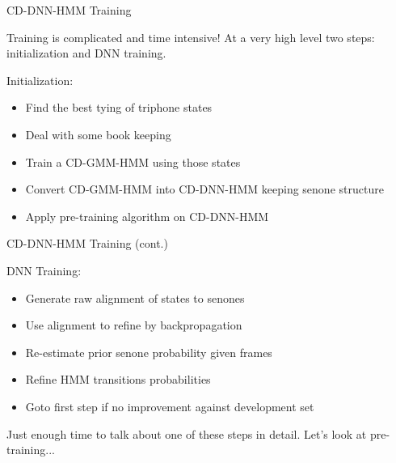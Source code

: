 \documentclass[notes]{beamer}
\begin{document}
\begin{frame}{CD-DNN-HMM Training}
	\begin{center}
		Training is complicated and time intensive! At a very high level two steps: initialization and DNN training.
	\end{center}
	
	\vfill
	
	Initialization:
	\begin{itemize}
		\item Find the best tying of triphone states
		\item Deal with some book keeping
		\item Train a CD-GMM-HMM using those states
		\item Convert CD-GMM-HMM into CD-DNN-HMM keeping senone structure
		\item Apply pre-training algorithm on CD-DNN-HMM
	\end{itemize}

	\vfill	

\end{frame}

\begin{frame}{CD-DNN-HMM Training (cont.)}
	\vfill
	
	DNN Training:
	
	\begin{itemize}
		\item Generate raw alignment of states to senones
		\item Use alignment to refine by backpropagation
		\item Re-estimate prior senone probability given frames
		\item Refine HMM transitions probabilities
		\item Goto first step if no improvement against development set
	\end{itemize}
	
	\vfill
	
	\vfill
	
	\begin{center}
	Just enough time to talk about one of these steps in detail. Let's look at pre-training...
	\end{center}
	
	\vfill
\end{frame}
\end{document}
